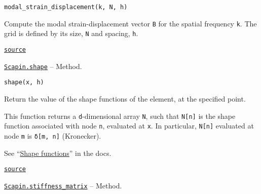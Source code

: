 \documentclass[oneside]{memoir}
\begin{document}
\begin{adjustwidth}{2em}{0pt}


\begin{verbatim}
modal_strain_displacement(k, N, h)
\end{verbatim}

Compute the modal strain-displacement vector \texttt{B} for the spatial frequency \texttt{k}. The grid is defined by its size, \texttt{N} and spacing, \texttt{h}.



\href{https://github.com/sbrisard/Scapin.jl/blob/ea3f90c60e90cdf214e41b1314a8ee608e0b8d10/src/bri17.jl#L32-L37}{\texttt{source}}


\end{adjustwidth}
\hypertarget{10268754520622093903}{} 
\hyperlink{10268754520622093903}{\texttt{Scapin.shape}}  -- {Method.}

\begin{adjustwidth}{2em}{0pt}


\begin{verbatim}
shape(x, h)
\end{verbatim}

Return the value of the shape functions of the element, at the specified point.

This function returns a \texttt{d}-dimensional array \texttt{N}, such that \texttt{N[n]} is the shape function associated with node \texttt{n}, evaluated at \texttt{x}. In particular, \texttt{N[n]} evaluated at node \texttt{m} is \texttt{δ[m, n]} (Kronecker).

See “\hyperlink{214055906537151257}{Shape functions}” in the docs.



\href{https://github.com/sbrisard/Scapin.jl/blob/ea3f90c60e90cdf214e41b1314a8ee608e0b8d10/src/bri17.jl#L146-L157}{\texttt{source}}


\end{adjustwidth}
\hypertarget{3239073789057218454}{} 
\hyperlink{3239073789057218454}{\texttt{Scapin.stiffness\_matrix}}  -- {Method.}
\end{document}
